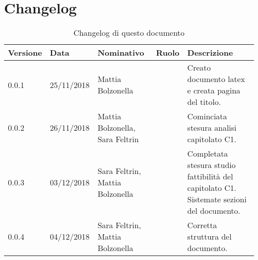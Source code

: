 \section{Changelog}
\begin{table}[tbph]
        \centering
        \begin{tabularx}{\textwidth}{|l|l|l|l|X|}
                \hline
                \textbf{Versione} & \textbf{Data} & \textbf{Nominativo}  & \textbf{Ruolo} & 
                \textbf{Descrizione}\\
              	\hline \hline
              	0.0.1 & 25/11/2018 & Mattia Bolzonella & & Creato documento latex e creata pagina 
              	del titolo. \\
              	\hline
              	0.0.2 & 26/11/2018 & Mattia Bolzonella, Sara Feltrin & &Cominciata stesura analisi
               	capitolato C1.\\
              	\hline
              	0.0.3 & 03/12/2018 & Sara Feltrin, Mattia Bolzonella & &Completata
              	stesura studio fattibilità del capitolato C1. Sistemate sezioni del documento. \\
              	\hline
              	0.0.4 & 04/12/2018 & Sara Feltrin, Mattia Bolzonella & &Corretta struttura del documento. \\
              	\hline
        \end{tabularx}
        \caption{Changelog di questo documento}
\end{table}